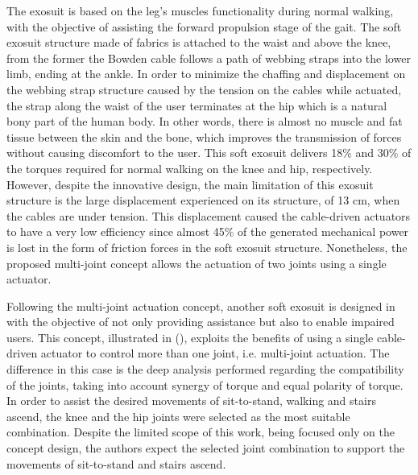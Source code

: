 The exosuit is based on the leg's muscles functionality during normal walking, with the objective of assisting the forward propulsion stage of the gait. The soft exosuit structure made of fabrics is attached to the waist and above the knee, from the former the Bowden cable follows a path of webbing straps into the lower limb, ending at the ankle. In order to minimize the chaffing and displacement on the webbing strap structure caused by the tension on the cables while actuated, the strap along the waist of the user terminates at the hip which is a natural bony part of the human body. In other words, there is almost no muscle and fat tissue between the skin and the bone, which improves the transmission of forces without causing discomfort to the user. This soft exosuit delivers 18\% and 30\% of the torques required for normal walking on the knee and hip, respectively. However, despite the innovative design, the main limitation of this exosuit structure is the large displacement experienced on its structure, of 13 cm, when the cables are under tension. This displacement caused the cable-driven actuators to have a very low efficiency since almost 45\% of the generated mechanical power is lost in the form of friction forces in the soft exosuit structure. Nonetheless, the proposed multi-joint concept allows the actuation of two joints using a single actuator.

Following the multi-joint actuation concept, another soft exosuit is designed in \cite{Bartenbach2015} with the objective of not only providing assistance but also to enable impaired users. This concept, illustrated in (), exploits the benefits of using a single cable-driven actuator to control more than one joint, i.e. multi-joint actuation. The difference in this case is the deep analysis performed regarding the compatibility of the joints, taking into account synergy of torque and equal polarity of torque. In order to assist the desired movements of sit-to-stand, walking and stairs ascend, the knee and the hip joints were selected as the most suitable combination. Despite the limited scope of this work, being focused only on the concept design, the authors expect the selected joint combination to support the movements of sit-to-stand and stairs ascend.


